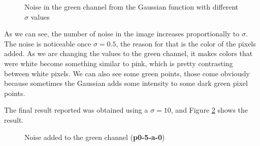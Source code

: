 \documentclass[12pt,a4paper]{article}
\begin{document}
\begin{figure}[!h]
	\caption{Noise in the green channel from the Gaussian function with different $\sigma$ values}%
	\label{fig:green-sigma}%
\end{figure}

As we can see, the number of noise in the image increases proportionally to $\sigma$. The noise is noticeable once $\sigma = 0.5$, the reason for that is the color of the pixels added. As we are changing the values to the green channel, it makes colors that were white become something similar to pink, which is pretty contrasting between white pixels. We can also see some green points, those come obviously because sometimes the Gaussian adds some intensity to some dark green pixel points.

The final result reported was obtained using a  $\sigma = 10$, and Figure \ref{fig:p0-5-a-0} shows the result.

\begin{figure}[!h]
	\centering
	{%
		\setlength{\fboxsep}{1pt}%
		\setlength{\fboxrule}{1pt}%
	}%
	\caption{Noise added to the green channel (\textbf{p0-5-a-0})}
	\label{fig:p0-5-a-0}
\end{figure}
\end{document}
